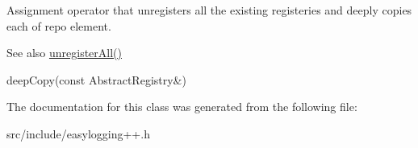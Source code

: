 Assignment operator that unregisters all the existing registeries and deeply copies each of repo element. 

\begin{DoxySeeAlso}{See also}
\hyperlink{classel_1_1base_1_1utils_1_1_registry_with_pred_a66b4eca5bb71f3fa3f0737105a00890c}{unregister\+All()} 

deep\+Copy(const Abstract\+Registry\&) 
\end{DoxySeeAlso}


The documentation for this class was generated from the following file\+:\begin{DoxyCompactItemize}
\item 
src/include/easylogging++.\+h\end{DoxyCompactItemize}
